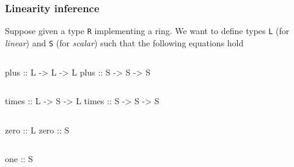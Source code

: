 \documentclass[10pt]{beamer}
\newcommand{\ra}{\rightarrow}
\begin{document}
\begin{frame}[fragile]
  \frametitle{Linearity inference}

  \begin{center}
    Suppose given a type \lstinline{R} implementing a ring. We want to
    define types \alert{\lstinline{L}} (for \emph{linear}) and
    \alert{\lstinline{S}} (for \emph{scalar}) such that the following
      equations hold
  \end{center}
  
  \begin{columns}
    \begin{column}{0.5\textwidth}
  \begin{semiverbatim}
    plus :: L -> L -> L
    plus :: S -> S -> S
  \end{semiverbatim}
    \end{column}
    \begin{column}{0.5\textwidth}
      \uncover<2>{\[\forall
        \alpha\in\{L,S\}.\alpha\ra\alpha\ra\alpha\]}
    \end{column}
  \end{columns}
  
  \begin{columns}[c]
    \begin{column}{0.5\textwidth}
  \begin{semiverbatim}
    times :: L -> S -> L
    times :: S -> S -> S
  \end{semiverbatim}
    \end{column}
    \begin{column}{0.5\textwidth}
      \uncover<2>{\[\forall
        \alpha\in\{L,S\}.\alpha\ra S\ra\alpha\]}
    \end{column}
  \end{columns}

  \begin{columns}
    \begin{column}{0.5\textwidth}
  \begin{semiverbatim}
    zero :: L
    zero :: S
  \end{semiverbatim}
    \end{column}
    \begin{column}{0.5\textwidth}
    \end{column}
  \end{columns}

  \begin{columns}
    \begin{column}{0.5\textwidth}
  \begin{semiverbatim}
    one :: S
  \end{semiverbatim}
    \end{column}
    \begin{column}{0.5\textwidth}
    \end{column}
  \end{columns}
\end{frame}  
\end{document}
